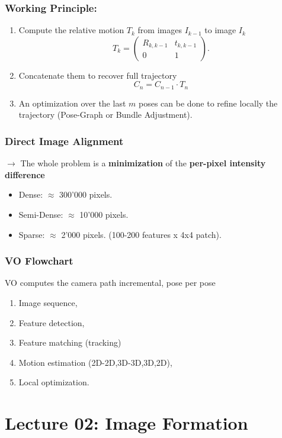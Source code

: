 \documentclass[a4paper,12 pt]{article}
\theoremstyle{definition}
\theoremstyle{remark}
\theoremstyle{definition}
\theoremstyle{definition}
\theoremstyle{definition}
\theoremstyle{remark}
\theoremstyle{definition}
\begin{document}
\subsubsection*{Working Principle:}
\begin{enumerate}[1.]
\item Compute the relative motion $T_k$ from images $I_{k-1}$ to image $I_k$
\begin{equation}
T_k=\begin{pmatrix}
R_{k,k-1}&t_{k,k-1}\\
0&1
\end{pmatrix}.
\end{equation}
\item Concatenate them to recover full trajectory
\begin{equation}
C_n=C_{n-1}\cdot T_n
\end{equation}
\item An optimization over the last $m$ poses can be done to refine locally the trajectory (Pose-Graph or Bundle Adjustment).
\end{enumerate}
\subsubsection*{Direct Image Alignment}
$\rightarrow$ The whole problem is a \textbf{minimization} of the \textbf{per-pixel intensity difference}
\begin{itemize}
\item Dense: $\approx$ 300'000 pixels.
\item Semi-Dense: $\approx$ 10'000 pixels.
\item Sparse: $\approx$ 2'000 pixels. (100-200 features x 4x4 patch).
\end{itemize}
\subsubsection*{VO Flowchart}
VO computes the camera path incremental, pose per pose
\begin{enumerate}
\item Image sequence,
\item Feature detection,
\item Feature matching (tracking)
\item Motion estimation (2D-2D,3D-3D,3D,2D),
\item Local optimization.
\end{enumerate}
\newpage 
\section*{Lecture 02: Image Formation}
\end{document}
